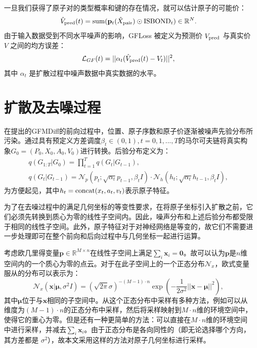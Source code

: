 一旦我们获得了原子对的类型概率和键的存在情况，就可以估计原子的可能价：
\begin{equation}
     \hat{V}_{{\rm pred}}(t) = {\rm sum}({\mathbf{p}}_t(\hat{X}_{{\rm pair}}) \odot {\rm ISBOND}_t) \in \mathbb{R}^{N}.
\end{equation}
由于输入数据受到不同水平噪声的影响，GFLoss 被定义为预测价 $V_{{\rm pred}}$ 与真实价 $V$ 之间的均方误差：
\begin{equation}
    \mathcal{L}_{GF}(t) = ||\alpha_t(\hat{V}_{{\rm pred}}(t) - V_t)||^2,
\end{equation}
其中 $\alpha_t$ 是扩散过程中噪声数据中真实数据的水平。

\section{扩散及去噪过程}
在提出的GFMDiff的前向过程中，位置、原子序数和原子价逐渐被噪声先验分布所污染。通过具有预定义方差调度$\beta_t \in (0, 1), t=0, 1, ..., T$的马尔可夫链将真实构象$G_0 = (P_0, X_0, A_0, V_0)$进行转换。后验分布定义为：
\begin{eqnarray}
    &q(G_{1:T}|G_0) = \prod^T_{t=1} q(G_t|G_{t-1}),& \\
    &q(G_t|G_{t-1}) = \mathcal{N}_p(p_t;\sqrt{\alpha_t} p_{t-1}, \beta_t I) \cdot \mathcal{N}_h(h_t;\sqrt{\alpha_t} h_{t-1}, \beta_t I),&
\end{eqnarray}
为方便起见，其中$h_t = {\rm concat}(x_t, a_t, v_t)$表示原子特征。

为了在去噪过程中的满足几何坐标的等变性要求，在将原子坐标引入扩散之前，它们必须先转换到质心为零的线性子空间内\cite{enf_satorras_21,edm_hoogeboom_22,geodiff_xu_22}。因此，噪声分布和上述后验分布都受限于相同的线性子空间。此外，原子特征对于对神经网络是等变的，故它们不需要进一步处理即可在整个前向和后向过程中与几何坐标一起进行运算。

考虑欧几里得变量$\mathbf{p} \in \mathbb{R}^{M \times n}$在线性子空间上满足$\sum_i \mathbf{x}_i = \mathbf{0}$。故可以认为$\mathbf{p}$是$n$维空间内的一个质心为零的点云。对于在此子空间上的一个正态分布$\mathcal{N}_x$，欧式变量服从的分布可以表示为：
\begin{equation}
    \mathcal{N}_x(\mathbf{x} | \mathbf{\mu}, \sigma^2 I) = (\sqrt{2 \pi} \sigma)^{-(M-1)\cdot n} \exp \left( -\frac{1}{2\sigma^2} || \mathbf{x} - \mathbf{\mu}||^2 \right),
\end{equation}
其中$\mathbf{\mu}$位于与$\mathbf{x}$相同的子空间中。从这个正态分布中采样有多种方法，例如可以从维度为$(M-1)\cdot n$的正态分布中采样，然后将采样映射到$M\cdot n$维的环境空间中，使得它的重心为零。但是还有一种更简单的方法：可以直接在$M\cdot n$维的环境空间中进行采样，并减去$\sum_i \mathbf{x}_i$。由于正态分布是各向同性的（即无论选择哪个方向，其方差都是 $\sigma^2$），故本文采用这样的方法对原子几何坐标进行采样。


